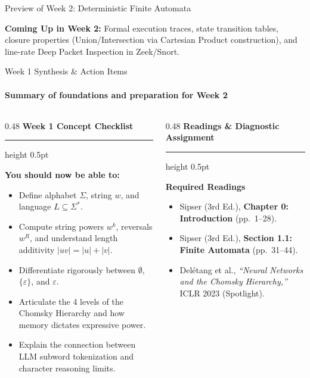 \documentclass[aspectratio=169, 10pt]{beamer}
\newcommand{\colheader}[1]{%
  {\noindent\footnotesize\bfseries\color{gimpanavy}#1}%
  \vspace{0.02cm}%
  {\color{gimpanavy!30}\hrule height 0.5pt}%
  \vspace{0.05cm}%
}
\newcommand{\cardtitle}[1]{{\noindent\footnotesize\bfseries\color{gimpanavy}#1}\par\vspace{0.03cm}}
\newcommand{\greentitle}[1]{{\noindent\footnotesize\bfseries\color{accentGreen}#1}\par\vspace{0.03cm}}
\begin{document}
\begin{frame}{Preview of Week 2: Deterministic Finite Automata}
  \vspace{0.08cm}
  \begin{tcolorbox}[spotlightcard]
    {\scriptsize\textbf{Coming Up in Week 2:} Formal execution traces, state transition tables, closure properties (Union/Intersection via Cartesian Product construction), and line-rate Deep Packet Inspection in Zeek/Snort.}
  \end{tcolorbox}
\end{frame}

\begin{frame}{Week 1 Synthesis \& Action Items}
  \framesubtitle{Summary of foundations and preparation for Week 2}
  
  \begin{columns}[T]
    \begin{column}{0.48\textwidth}
      \colheader{Week 1 Concept Checklist}
      \begin{tcolorbox}[conceptcard]
        \cardtitle{You should now be able to:}
        \begin{itemize}\setlength{\itemsep}{2pt}\scriptsize
          \item Define alphabet $\Sigma$, string $w$, and language $L \subseteq \Sigma^*$.
          \item Compute string powers $w^k$, reversals $w^R$, and understand length additivity $|uv| = |u| + |v|$.
          \item Differentiate rigorously between $\emptyset$, $\{\varepsilon\}$, and $\varepsilon$.
          \item Articulate the 4 levels of the Chomsky Hierarchy and how memory dictates expressive power.
          \item Explain the connection between LLM subword tokenization and character reasoning limits.
        \end{itemize}
      \end{tcolorbox}
    \end{column}
    
    \begin{column}{0.48\textwidth}
      \colheader{Readings \& Diagnostic Assignment}
      \begin{tcolorbox}[examplecard]
        \greentitle{Required Readings}
        \begin{itemize}\setlength{\itemsep}{1.5pt}\scriptsize
          \item Sipser (3rd Ed.), \textbf{Chapter 0: Introduction} (pp.~1--28).
          \item Sipser (3rd Ed.), \textbf{Section 1.1: Finite Automata} (pp.~31--44).
          \item Delétang et al., \textit{``Neural Networks and the Chomsky Hierarchy,''} ICLR 2023 (Spotlight).
        \end{itemize}
        \vspace{0.04cm}
        

\end{tcolorbox}
\end{column}
\end{columns}
\end{frame}
\end{document}
